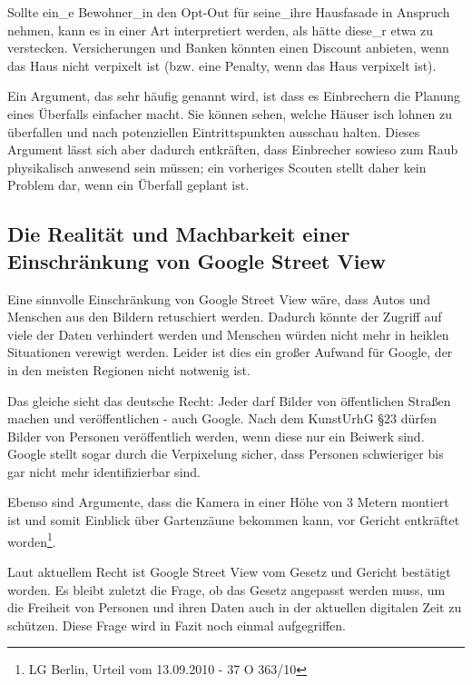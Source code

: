 Sollte ein\_e Bewohner\_in den Opt-Out für seine\_ihre Hausfasade in Anspruch nehmen, kann es
in einer Art interpretiert werden, als hätte diese\_r etwa zu verstecken.
Versicherungen und Banken könnten einen Discount anbieten, wenn das Haus nicht
verpixelt ist (bzw. eine Penalty, wenn das Haus verpixelt ist).

Ein Argument, das sehr häufig genannt wird, ist dass es Einbrechern die Planung
eines Überfalls einfacher macht. Sie können sehen, welche Häuser isch lohnen zu
überfallen und nach potenziellen Eintrittspunkten ausschau halten. Dieses
Argument lässt sich aber dadurch entkräften, dass Einbrecher sowieso zum Raub
physikalisch anwesend sein müssen; ein vorheriges Scouten stellt daher kein
Problem dar, wenn ein Überfall geplant ist.

\subsection{Die Realität und Machbarkeit einer Einschränkung von Google Street View}

Eine sinnvolle Einschränkung von Google Street View wäre, dass Autos und
Menschen aus den Bildern retuschiert werden. Dadurch könnte der Zugriff auf
viele der Daten verhindert werden und Menschen würden nicht mehr in heiklen
Situationen verewigt werden. Leider ist dies ein großer Aufwand für Google, der
in den meisten Regionen nicht notwenig ist.

Das gleiche sieht das deutsche Recht: Jeder darf Bilder von öffentlichen Straßen
machen und veröffentlichen - auch Google. Nach dem KunstUrhG §23 dürfen Bilder
von Personen veröffentlich werden, wenn diese nur ein Beiwerk sind. Google
stellt sogar durch die Verpixelung sicher, dass Personen schwieriger bis gar
nicht mehr identifizierbar sind.

Ebenso sind Argumente, dass die Kamera in einer Höhe von 3 Metern montiert ist
und somit Einblick über Gartenzäune bekommen kann, vor Gericht entkräftet
worden\footnote{LG Berlin, Urteil vom 13.09.2010 - 37 O 363/10}.

Laut aktuellem Recht ist Google Street View vom Gesetz und Gericht bestätigt
worden. Es bleibt zuletzt die Frage, ob das Gesetz angepasst werden muss, um die
Freiheit von Personen und ihren Daten auch in der aktuellen digitalen Zeit zu
schützen. Diese Frage wird in Fazit noch einmal aufgegriffen.
